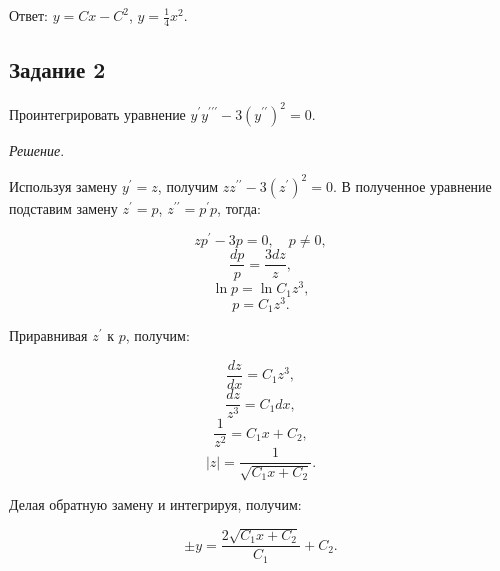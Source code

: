 \documentclass[11pt, a4paper]{article}
\begin{document}
	\par\noindent	
	Ответ: $y = Cx - C^2$, $y = \frac{1}{4} x^2$.
	
	
	\subsection*{Задание 2}
	
	\par
	Проинтегрировать уравнение $y^\prime y^{\prime\prime\prime} - 3(y^{\prime\prime})^2 = 0$.
	
	\vspace{0.2cm}
	\par
	\textit{Решение}. 
	
	\par
	Используя замену $y^\prime = z$, получим $zz^{\prime\prime} - 3(z^\prime)^2 = 0$. В полученное уравнение подставим замену $z^\prime = p$, $z^{\prime\prime} = p^\prime p$, тогда:
	
	\begin{equation*}
    	zp^\prime - 3p = 0, \quad p \neq 0,
	\end{equation*}
	\begin{equation*}
    	\dfrac{dp}{p} = \dfrac{3dz}{z},
	\end{equation*}
	\begin{equation*}
    	\ln{p} = \ln{C_1z^3},
	\end{equation*}
	\begin{equation*}
    	p = C_1z^3.
	\end{equation*}
	
	\par
	Приравнивая $z^\prime$ к $p$, получим:
	
	\begin{equation*}
    	\dfrac{dz}{dx} = C_1z^3,
	\end{equation*}
	\begin{equation*}
    	\dfrac{dz}{z^3} = C_1dx,
	\end{equation*}
	\begin{equation*}
    	\dfrac{1}{z^2} = C_1x + C_2,
	\end{equation*}
	\begin{equation*}
    	|z| = \dfrac{1}{\sqrt{C_1x + C_2}}.
	\end{equation*}
	
	\par
	Делая обратную замену и интегрируя, получим:
	
	\begin{equation*}
    	\pm y = \dfrac{2\sqrt{C_1x + C_2}}{C_1} + C_2.
	\end{equation*}
	
\end{document}
